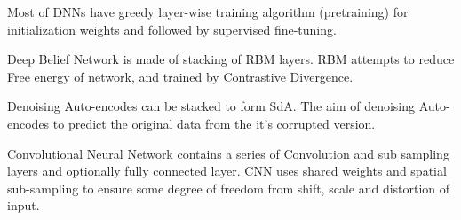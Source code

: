 Most of DNNs have greedy layer-wise training algorithm (pretraining) for initialization weights and followed by supervised fine-tuning.
 
Deep Belief Network is made of stacking of RBM layers. RBM attempts to reduce Free energy of network, and trained by Contrastive Divergence.
  
Denoising Auto-encodes can be stacked to form SdA. The aim of denoising Auto-encodes to predict the original data from the it's corrupted version.

Convolutional Neural Network contains a series of Convolution and sub sampling layers and optionally fully connected layer. CNN uses shared weights and spatial sub-sampling to ensure some degree of freedom from shift, scale and distortion of input.